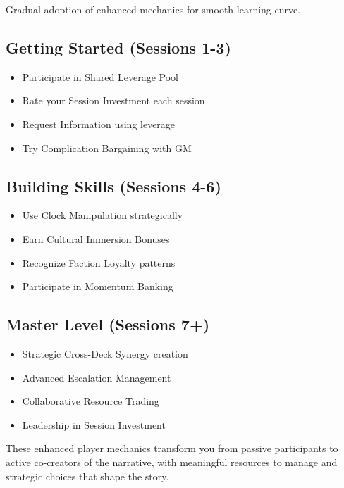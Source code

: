 Gradual adoption of enhanced mechanics for smooth learning curve.

\subsection{Getting Started (Sessions 1-3)}

\begin{itemize}
\item Participate in Shared Leverage Pool
\item Rate your Session Investment each session
\item Request Information using leverage
\item Try Complication Bargaining with GM
\end{itemize}

\subsection{Building Skills (Sessions 4-6)}

\begin{itemize}
\item Use Clock Manipulation strategically
\item Earn Cultural Immersion Bonuses
\item Recognize Faction Loyalty patterns
\item Participate in Momentum Banking
\end{itemize}

\subsection{Master Level (Sessions 7+)}

\begin{itemize}
\item Strategic Cross-Deck Synergy creation
\item Advanced Escalation Management
\item Collaborative Resource Trading
\item Leadership in Session Investment
\end{itemize}

These enhanced player mechanics transform you from passive participants to active co-creators of the narrative, with meaningful resources to manage and strategic choices that shape the story.

